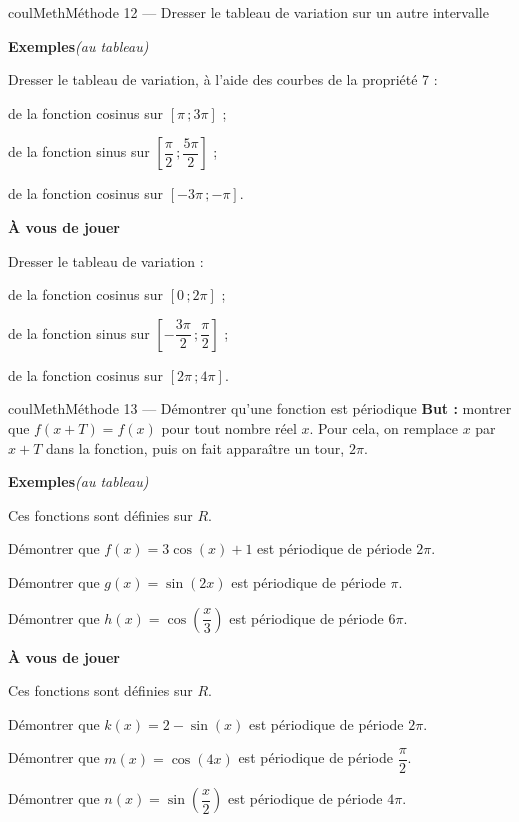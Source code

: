\documentclass[11pt,a4paper]{article}
\makeatletter
\newcommand{\R}{\mathbb{R}}
\newcommand{\N}{\mathbb{N}}
\newcommand{\Z}{\mathbb{Z}}
\newcommand{\Q}{\mathbb{Q}}
\newcommand{\vect}[1]{\overrightarrow{#1}}
\newcommand{\fois}[1]{\times{\color{coulExo}#1}}
\newcommand{\lycee@intff}[2]{\left[#1\,;#2\right]}
\providecommand{\Cf}{\mathcal{C}\sb{f}}%
\providecommand{\Cg}{\mathcal{C}\sb{g}}%
\providecommand{\intff}{\lycee@intff}%
\newcounter{lycee@signet}
\newcommand{\signet}[3][]{\stepcounter{lycee@signet}%
  \edef\lycee@dest{\if\relax\detokenize{#1}\relax
    signet.\arabic{lycee@signet}\else#1\fi}%
  \hypertarget{\lycee@dest}{}\bookmark[level=#2,dest=\lycee@dest]{#3}}
\def\R{R}\def\N{N}\def\Z{Z}\def\Q{Q}\def\vect#1{#1}\def\Cf{Cf}\def\Cg{Cg}\def\fois#1{×#1}%
\newcounter{methode}
\newenvironment{methodebox}[1][Méthode]{\stepcounter{methode}%
  \begin{boitecours}[phantom={\signet[methode-\arabic{methode}]{2}{#1}}]{coulMeth}{#1}}%
  {\end{boitecours}}
\newcommand{\etape}[1]{\par\smallskip\textbf{\color{coulMeth}#1}\par\nobreak\smallskip}
\newcommand{\autableau}{\hfill{\footnotesize\itshape\color{black!45}(au tableau)}}
\newcommand{\etapeexemples}{%
    \par\smallskip\textbf{\color{coulMeth}Exemples}\autableau\par\nobreak\smallskip}
\makeatother
\begin{document}
\begin{methodebox}[Méthode 12 --- Dresser le tableau de variation sur un autre intervalle]
\etapeexemples
Dresser le tableau de variation, à l'aide des courbes de la propriété 7 :
\begin{questions}[label=\alph*)]
  \item de la fonction cosinus sur $\intff{\pi}{3\pi}$ ;
  \item de la fonction sinus sur $\intff{\dfrac{\pi}{2}}{\dfrac{5\pi}{2}}$ ;
  \item de la fonction cosinus sur $\intff{-3\pi}{-\pi}$.
\end{questions}

\etape{À vous de jouer}
Dresser le tableau de variation :
\begin{questions}[label=\alph*)]
  \item de la fonction cosinus sur $\intff{0}{2\pi}$ ;
  \item de la fonction sinus sur $\intff{-\dfrac{3\pi}{2}}{\dfrac{\pi}{2}}$ ;
  \item de la fonction cosinus sur $\intff{2\pi}{4\pi}$.
\end{questions}

\end{methodebox}

\begin{methodebox}[Méthode 13 --- Démontrer qu'une fonction est périodique]
\textbf{But :} montrer que $f(x+T)=f(x)$ pour tout nombre réel $x$. Pour cela, on remplace
$x$ par $x+T$ dans la fonction, puis on fait apparaître un tour, $2\pi$.
\etapeexemples
Ces fonctions sont définies sur $\R$.
\begin{questions}[label=\alph*)]
  \item Démontrer que $f(x)=3\cos(x)+1$ est périodique de période $2\pi$.
  \item Démontrer que $g(x)=\sin(2x)$ est périodique de période $\pi$.
  \item Démontrer que $h(x)=\cos\left(\dfrac{x}{3}\right)$ est périodique de période $6\pi$.
\end{questions}

\etape{À vous de jouer}
Ces fonctions sont définies sur $\R$.
\begin{questions}[label=\alph*)]
  \item Démontrer que $k(x)=2-\sin(x)$ est périodique de période $2\pi$.
  \item Démontrer que $m(x)=\cos(4x)$ est périodique de période $\dfrac{\pi}{2}$.
  \item Démontrer que $n(x)=\sin\left(\dfrac{x}{2}\right)$ est périodique de période $4\pi$.
\end{questions}

\end{methodebox}
\end{document}
